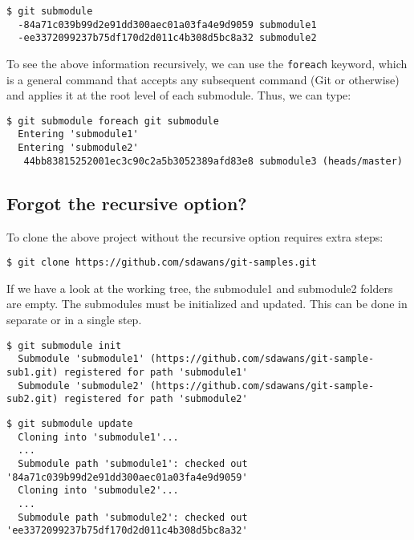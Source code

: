 \documentclass[a4paper]{../../common/tufte-latex/tufte-handout}
\begin{document}
\begin{lstlisting}[style=BashInputStyle]
  $ git submodule
  -84a71c039b99d2e91dd300aec01a03fa4e9d9059 submodule1
  -ee3372099237b75df170d2d011c4b308d5bc8a32 submodule2
\end{lstlisting}

To see the above information recursively, we can use the \texttt{foreach} keyword, which is a general command that accepts any subsequent command (Git or otherwise) and applies it at the root level of each submodule. Thus, we can type:

\begin{lstlisting}[style=BashInputStyle]
  $ git submodule foreach git submodule
  Entering 'submodule1'
  Entering 'submodule2'
   44bb83815252001ec3c90c2a5b3052389afd83e8 submodule3 (heads/master)
\end{lstlisting}

\subsection{Forgot the recursive option?}

To clone the above project without the recursive option requires extra steps:

\begin{lstlisting}[style=BashInputStyle]
  $ git clone https://github.com/sdawans/git-samples.git
\end{lstlisting}

If we have a look at the working tree, the submodule1 and submodule2 folders are empty.
The submodules must be initialized and updated. This can be done in separate or in a single step.

\begin{lstlisting}[style=BashInputStyle]
  $ git submodule init
  Submodule 'submodule1' (https://github.com/sdawans/git-sample-sub1.git) registered for path 'submodule1'
  Submodule 'submodule2' (https://github.com/sdawans/git-sample-sub2.git) registered for path 'submodule2'
\end{lstlisting}


\begin{lstlisting}[style=BashInputStyle]
  $ git submodule update
  Cloning into 'submodule1'...
  ...
  Submodule path 'submodule1': checked out '84a71c039b99d2e91dd300aec01a03fa4e9d9059'
  Cloning into 'submodule2'...
  ...
  Submodule path 'submodule2': checked out 'ee3372099237b75df170d2d011c4b308d5bc8a32'
\end{lstlisting}
\end{document}
